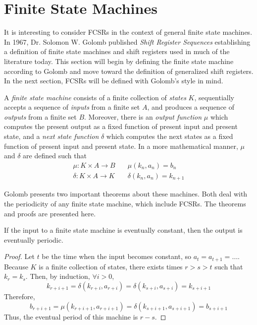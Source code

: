 \section{Finite State Machines}
\par It is interesting to consider FCSRs in the context of general finite state
machines. In 1967, Dr. Solomon W. Golomb published {\em Shift Register Sequences}
establishing a definition of finite state machines and shift registers used in
much of the literature today. This section will begin by defining the finite state
machine according to Golomb and move toward the definition of generalized shift
registers. In the next section, FCSRs will be defined with Golomb's style in mind.

\begin{definition}\label{finite-state-machine}
  A {\em finite state machine} consists of a finite collection of {\em states}
  $K$, sequentially accepts a sequence of {\em inputs} from a finite set
  $A$, and produces a sequence of {\em outputs} from a finite set
  $B$. Moreover, there is an {\em output function} $\mu$ which computes
  the present output as a fixed function of present input and present state, and a
  {\em next state function} $\delta$ which computes the next states as a fixed
  function of present input and present state. In a more mathematical manner,
  $\mu$ and $\delta$ are defined such that
  \begin{eqnarray}
    \mu:K \times A \rightarrow B \quad &\mu(k_n,a_n)=b_n \\
    \delta:K \times A \rightarrow K \quad &\delta(k_n,a_n)=k_{n+1}
  \end{eqnarray}
\end{definition}


\par Golomb presents two important theorems about these machines. Both deal with
the periodicity of any finite state machine, which include FCSRs. The theorems
and proofs are presented here.

\begin{theorem}\label{thm:golomb-1}
  If the input to a finite state machine is eventually constant, then the output
  is eventually periodic.
\end{theorem}
\begin{proof}
  Let $t$ be the time when the input becomes constant, so $a_t=a_{t+1}=\dots$.
  Because $K$ is a finite collection of states, there exists times $r>s>t$ such
  that $k_r=k_s$. Then, by induction, $\forall i>0$,
  \[
  k_{r+i+1}=\delta(k_{r+i},a_{r+i})=\delta(k_{s+i},a_{s+i})=k_{s+i+1}
  \]
  Therefore,
  \[
  b_{r+i+1}=\mu(k_{r+i+1},a_{r+i+1})=\delta(k_{s+i+1},a_{s+i+1})=b_{s+i+1}
  \]
  Thus, the eventual period of this machine is $r-s$.
\end{proof}

